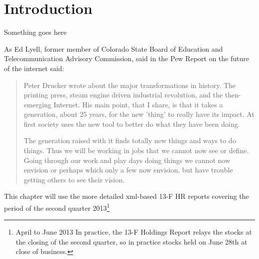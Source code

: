 \chapter{Introduction}
\label{ChapterI}
Something goes here


As Ed Lyell, former member of Colorado State Board of Education and Telecommunication Advisory Commission, said in the Pew Report on the future of the internet said: 
	
\begin{quote}Peter Drucker wrote about the major transformations in history. The printing press, steam engine driven industrial revolution, and the then-emerging Internet. His main point, that I share, is that it takes a generation, about 25 years, for the new 'thing' to really have its impact. At first society uses the new tool to better do what they have been doing. 
		
The generation raised with it finds totally new things and ways to do things. Thus we will be working in jobs that we cannot now see or define. Going through our work and play days doing things we cannot now envision or perhaps which only a few now envision, but have trouble getting others to see their vision.   \citep{Pew2010}
	\end{quote} 
	
	
	
	This chapter will use the more detailed xml-based 13-F HR reports covering the period of the second quarter 2013\footnote{April to June 2013  In practice, the 13-F Holdings Report relays the stocks at the closing of the second quarter, so in practice stocks held on June 28th at close of business.} 